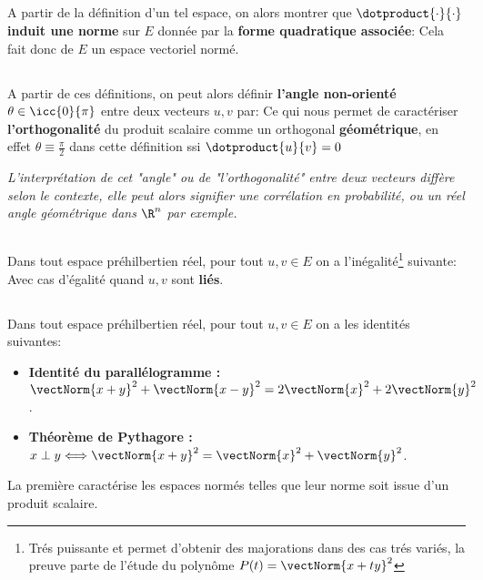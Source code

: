 \subsection*{}
A partir de la définition d'un tel espace, on alors montrer que \(\dotproduct{\cdot}{\cdot}\) \textbf{induit une norme} sur \(E\) donnée par la \textbf{forme quadratique associée}:
Cela fait donc de \(E\) un espace vectoriel normé.
\subsection*{}
A partir de ces définitions, on peut alors définir \textbf{l'angle non-orienté} \(\theta \in \icc{0}{\pi}\) entre deux vecteurs \(u, v\) par:
Ce qui nous permet de caractériser \textbf{l'orthogonalité} du produit scalaire comme un orthogonal \textbf{géométrique}, en effet \(\theta \equiv \frac{\pi}{2}\) dans cette définition ssi \(\dotproduct{u}{v} = 0\)
\begin{center}
   \textit{L'interprétation de cet "angle" ou de "l'orthogonalité" entre deux vecteurs diffère selon le contexte, elle peut alors signifier une corrélation en probabilité, ou un réel angle géométrique dans \(\R^n\) par exemple.}
\end{center}
\subsection*{}
Dans tout espace préhilbertien réel, pour tout \(u, v \in E\) on a l'inégalité\footnote[1]{Trés puissante et permet d'obtenir des majorations dans des cas trés variés, la preuve parte de l'étude du polynôme \(P(t) = \vectNorm{x + ty}^2\)} suivante:
Avec cas d'égalité quand \(u, v\) sont \textbf{liés}.
\subsection*{}
Dans tout espace préhilbertien réel, pour tout \(u, v \in E\) on a les identités suivantes:
\begin{itemize}
   \item \textbf{Identité du parallélogramme :} \(\vectNorm{x + y}^2 + \vectNorm{x - y}^2 = 2\vectNorm{x}^2 + 2\vectNorm{y}^2\).

   \item \textbf{Théorème de Pythagore :} \(x \perp y \Longleftrightarrow \vectNorm{x + y}^2 = \vectNorm{x}^2 + \vectNorm{y}^2\).
\end{itemize}
La première caractérise les espaces normés telles que leur norme soit issue d'un produit scalaire.
